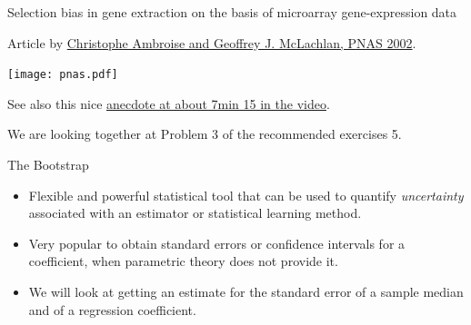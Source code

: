 \documentclass[
  10pt,
  ignorenonframetext,
]{beamer}
\providecommand{\tightlist}{%
  \setlength{\itemsep}{0pt}\setlength{\parskip}{0pt}}
\begin{document}
\begin{frame}
\begin{block}{Selection bias in gene extraction on the basis of
microarray gene-expression data}
\protect\hypertarget{selection-bias-in-gene-extraction-on-the-basis-of-microarray-gene-expression-data}{}
\vspace{2mm}

Article by \href{http://www.pnas.org/content/99/10/6562}{Christophe
Ambroise and Geoffrey J. McLachlan, PNAS 2002}.

\texttt{[image: pnas.pdf]}

\vspace{10mm}

See also this nice
\href{https://www.youtube.com/watch?v=r64tRyHFAJ8\&list=PLAOUn-KLSAVNz3lv4a957qRpfPWH2EOg4\&index=3}{anecdote
at about 7min 15 in the video}.
\end{block}
\end{frame}

\begin{frame}
We are looking together at Problem 3 of the recommended exercises 5.
\end{frame}

\begin{frame}{The Bootstrap}
\protect\hypertarget{the-bootstrap}{}
\vspace{2mm}

\begin{itemize}
\tightlist
\item
  Flexible and powerful statistical tool that can be used to quantify
  \emph{uncertainty} associated with an estimator or statistical
  learning method.
\end{itemize}

\vspace{2mm}

\begin{itemize}
\tightlist
\item
  Very popular to obtain standard errors or confidence intervals for a
  coefficient, when parametric theory does not provide it.
\end{itemize}

\vspace{2mm}

\begin{itemize}
\tightlist
\item
  We will look at getting an estimate for the standard error of a sample
  median and of a regression coefficient.
\end{itemize}
\end{frame}
\end{document}
